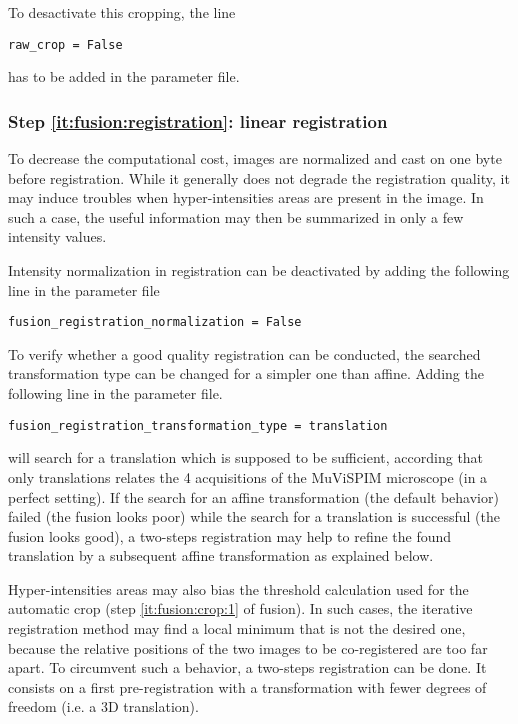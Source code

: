 To desactivate this cropping, the line
\begin{verbatim}
raw_crop = False
\end{verbatim}
has to be added in the parameter file.

\subsubsection{Step \ref{it:fusion:registration}: linear registration}
\label{sec:cli:fuse:linear:registration}

To decrease the computational cost, images are normalized and cast on one byte before registration. While it generally does not degrade the registration quality, it may induce troubles when hyper-intensities areas are present in the image. In such a case, the useful information may then be summarized in only a few intensity values.

Intensity normalization in registration can be deactivated by adding the following line in the parameter file
\begin{verbatim}
fusion_registration_normalization = False
\end{verbatim}

To verify whether a good quality registration can be conducted, the searched transformation type can be changed for a simpler one than affine. 
Adding the following line in the parameter file.
\begin{verbatim}
fusion_registration_transformation_type = translation
\end{verbatim}
will search for a translation which is supposed to be sufficient, according that only translations relates the 4 acquisitions of the MuViSPIM microscope (in a perfect setting). If the search for an affine transformation (the default behavior) failed (the fusion looks poor) while the search for a translation is successful (the fusion looks good), a two-steps registration may help to refine the found translation by a subsequent affine transformation as explained below.

Hyper-intensities areas may also bias the threshold calculation used for the automatic crop (step \ref{it:fusion:crop:1} of fusion). In such cases, the iterative registration method may find a local minimum that is not the desired one, because the relative positions of the two images to be co-registered are too far apart. To circumvent such a behavior, a two-steps registration can be done. It consists on a first pre-registration with a transformation with fewer degrees of freedom (i.e. a 3D translation). 

